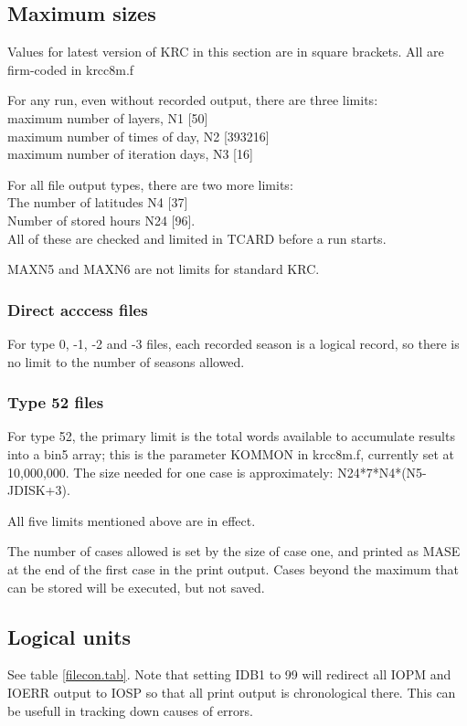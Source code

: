 \documentclass{article}
\newcommand{\qi}{\\ \hspace*{2.em}}      %
\begin{document}
\subsection{Maximum sizes} %
Values for latest version of KRC in this section are in square brackets. All are
firm-coded in krcc8m.f

For any run, even without recorded output, there are three limits:
\qi maximum number of layers, N1 [50]  
\qi maximum number of times of day, N2 [393216]
\qi maximum number of iteration days, N3 [16]

For all file output types, there are two more limits:
\qi The number of latitudes N4 [37] 
\qi  Number of stored hours N24 [96]. 
\\ All of these are checked and limited in TCARD before a run starts.

MAXN5 and MAXN6 are not limits for standard KRC.

\subsubsection{Direct acccess files} %
For type 0, -1, -2 and -3 files, each recorded season is a logical record, so
there is no limit to the number of seasons allowed.

\subsubsection{Type 52 files} %

For type 52, the primary limit is the total words available to accumulate
results into a bin5 array; this is the parameter KOMMON in krcc8m.f, currently
set at 10,000,000. The size needed for one case is approximately:  
N24*7*N4*(N5-JDISK+3).

All five limits mentioned above are in effect.

The number of cases allowed is set by the size of case one, and printed as MASE
at the end of the first case in the print output. Cases beyond the maximum that
can be stored will be executed, but not saved.

\subsection{Logical units} %
See table \ref{filecon.tab}. Note that setting IDB1 to 99 will redirect all IOPM
and IOERR output to IOSP so that all print output is chronological there. This
can be usefull in tracking down causes of errors.
\end{document}
